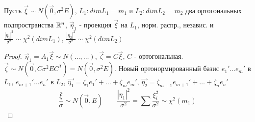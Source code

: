 \documentclass{article}
\begin{document}
\begin{theorem}[О проекции]
  Пусть $\vec{\xi}\sim N(\vec{0},\sigma^{2}E)$, $L_1:dimL_1=m_1$ и $L_2:dimL_2=m_2$ два
  ортогональных подпространства $\mathbb{R}^{n}$, $\vec{\eta}_1$ - проекция $\vec{\xi}$ на $L_1$,
  норм. распр., независ. и $\frac{|\eta_1|^{2}}{\sigma^{2}}\sim\chi^{2}(dimL_1)$,
  $\frac{|\eta_2|^{2}}{\sigma^{2}}\sim\chi^{2}(dimL_2)$
\end{theorem}
\begin{proof}
  $\vec{\eta}_1=A_1\vec{\xi}\sim N(\dots,\dots )$, $\vec{\zeta}=C\vec{\xi}$,
  $C$ - ортогональная. $\vec{\zeta}\sim N(\vec{0},C\sigma^{2}EC^{T})=N(\vec{0},\sigma^{2}E)$.
  Новый ортонормированный базис $e_1'\dots e_{m}'$ в $L_1$, 
  $e_{m+1}'\dots e_{n}'$ в $L_2$, $\vec{\eta_1}=\zeta_1e_1'+\dots +\zeta_{m}e_{m}'$,
  $\vec{\eta_2}=\zeta_{m+1}e_{m+1}'+\dots +\zeta_{n}e_{n}'$
\[
  \frac{\bar{\xi}}{\sigma}\sim N(\vec{0},E) \qquad \frac{|\eta_1|^{2}}{\sigma^{2}}=\sum_{}^{}\frac{\xi_i^{2}}{\sigma^{2}}\sim \chi^{2}(m_1)
\]
\end{proof}
\end{document}
